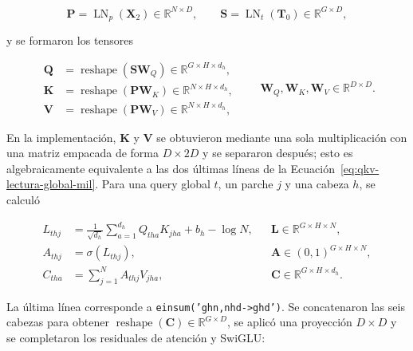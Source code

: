 \begin{equation}
    \mathbf P=\operatorname{LN}_{p}(\mathbf X_2)\in\mathbb R^{N\times D},
    \qquad
    \mathbf S=\operatorname{LN}_{t}(\mathbf T_0)\in\mathbb R^{G\times D},
    \label{eq:entradas-lectura-global-mil}
\end{equation}

y se formaron los tensores

\begin{equation}
    \begin{aligned}
    \mathbf Q&=\operatorname{reshape}(\mathbf S\mathbf W_Q)
       \in\mathbb R^{G\times H\times d_h},\\
    \mathbf K&=\operatorname{reshape}(\mathbf P\mathbf W_K)
       \in\mathbb R^{N\times H\times d_h},\\
    \mathbf V&=\operatorname{reshape}(\mathbf P\mathbf W_V)
       \in\mathbb R^{N\times H\times d_h},
    \end{aligned}
    \qquad
    \mathbf W_Q,\mathbf W_K,\mathbf W_V\in\mathbb R^{D\times D}.
    \label{eq:qkv-lectura-global-mil}
\end{equation}

En la implementación, \(\mathbf K\) y \(\mathbf V\) se obtuvieron mediante
una sola multiplicación con una matriz empacada de forma \(D\times2D\) y se
separaron después; esto es algebraicamente equivalente a las dos últimas líneas
de la Ecuación~\eqref{eq:qkv-lectura-global-mil}. Para una query global
\(t\), un parche \(j\) y una cabeza \(h\), se calculó

\begin{equation}
    \begin{aligned}
    L_{thj}&=\frac{1}{\sqrt{d_h}}
       \sum_{a=1}^{d_h}Q_{tha}K_{jha}+b_h-\log N,
       &&\mathbf L\in\mathbb R^{G\times H\times N},\\
    A_{thj}&=\sigma(L_{thj}),
       &&\mathbf A\in(0,1)^{G\times H\times N},\\
    C_{tha}&=\sum_{j=1}^{N}A_{thj}V_{jha},
       &&\mathbf C\in\mathbb R^{G\times H\times d_h}.
    \end{aligned}
    \label{eq:atencion-sigmoidal-mil}
\end{equation}

La última línea corresponde a
\texttt{einsum('ghn,nhd->ghd')}. Se concatenaron las seis cabezas para obtener
\(\operatorname{reshape}(\mathbf C)\in\mathbb R^{G\times D}\), se aplicó una
proyección \(D\times D\) y se completaron los residuales de atención y SwiGLU:

